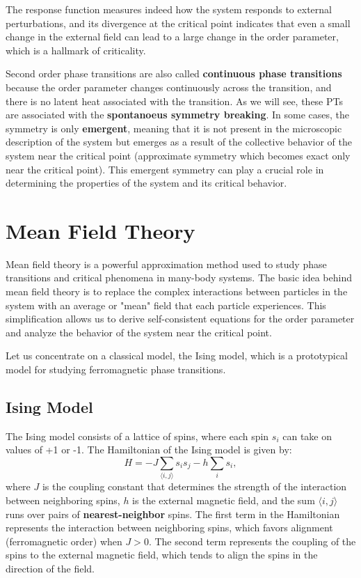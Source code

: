 The response function measures indeed how the system responds to external perturbations, and its divergence at the critical point indicates that even a small change in the external field can lead to a large change in the order parameter, which is a hallmark of criticality.

\begin{remark}
    Second order phase transitions are also called \textbf{continuous phase transitions} because the order parameter changes continuously across the transition, and there is no latent heat associated with the transition. As we will see, these PTs are associated with the \textbf{spontanoeus symmetry breaking}. In some cases, the symmetry is only \textbf{emergent}, meaning that it is not present in the microscopic description of the system but emerges as a result of the collective behavior of the system near the critical point (approximate symmetry which becomes exact only near the critical point). This emergent symmetry can play a crucial role in determining the properties of the system and its critical behavior.
\end{remark}


\section{Mean Field Theory}

Mean field theory is a powerful approximation method used to study phase transitions and critical phenomena in many-body systems. The basic idea behind mean field theory is to replace the complex interactions between particles in the system with an average or "mean" field that each particle experiences. This simplification allows us to derive self-consistent equations for the order parameter and analyze the behavior of the system near the critical point.

Let us concentrate on a classical model, the Ising model, which is a prototypical model for studying ferromagnetic phase transitions.

\subsection{Ising Model} 

The Ising model consists of a lattice of spins, where each spin \(s_i\) can take on values of +1 or -1. The Hamiltonian of the Ising model is given by:
\[
    H = - J \sum_{\langle i,j \rangle} s_i s_j - h \sum_i s_i,
\]
where \(J\) is the coupling constant that determines the strength of the interaction between neighboring spins, \(h\) is the external magnetic field, and the sum \(\langle i,j \rangle\) runs over pairs of \textbf{nearest-neighbor} spins. The first term in the Hamiltonian represents the interaction between neighboring spins, which favors alignment (ferromagnetic order) when \(J > 0\). The second term represents the coupling of the spins to the external magnetic field, which tends to align the spins in the direction of the field.

